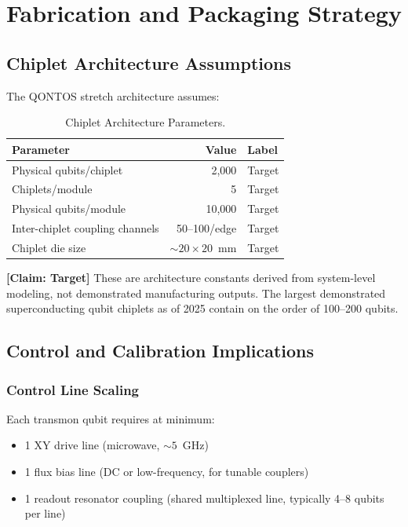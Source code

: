 \documentclass[conference]{IEEEtran}
\begin{document}
\section{Fabrication and Packaging Strategy}

\subsection{Chiplet Architecture Assumptions}

The QONTOS stretch architecture assumes:

\begin{table}[htbp]
\centering
\caption{Chiplet Architecture Parameters.}
\label{tab:chiplet_arch}
\begin{tabular}{lrl}
\toprule
\textbf{Parameter} & \textbf{Value} & \textbf{Label} \\
\midrule
Physical qubits/chiplet & 2,000 & Target \\
Chiplets/module & 5 & Target \\
Physical qubits/module & 10,000 & Target \\
Inter-chiplet coupling channels & 50--100/edge & Target \\
Chiplet die size & ${\sim}20 \times 20$~mm & Target \\
\bottomrule
\end{tabular}
\end{table}

\textbf{[Claim: Target]} These are architecture constants derived from system-level modeling, not demonstrated manufacturing outputs. The largest demonstrated superconducting qubit chiplets as of 2025 contain on the order of 100--200 qubits.

\subsection{Control and Calibration Implications}

\subsubsection{Control Line Scaling}

Each transmon qubit requires at minimum:

\begin{itemize}
\item 1 XY drive line (microwave, ${\sim}5$~GHz)
\item 1 flux bias line (DC or low-frequency, for tunable couplers)
\item 1 readout resonator coupling (shared multiplexed line, typically 4--8 qubits per line)
\end{itemize}
\end{document}
